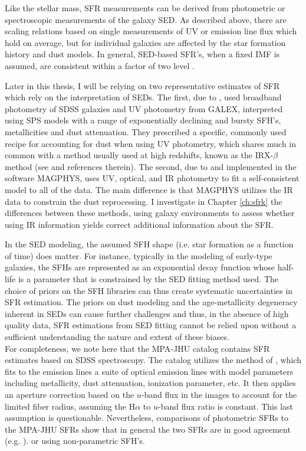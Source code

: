 Like the stellar mass, SFR measurements can be derived from
photometric or spectroscopic measurements of the galaxy SED. As
described above, there are scaling relations based on single
measurements of UV or emission line flux which hold on average, but
for individual galaxies are affected by the star formation history and
dust models.  In general, SED-based SFR's, when a fixed IMF is
assumed, are consistent within a factor of two level
\citep{conroy_modeling_2013}.

Later in this thesis, I will be relying on two representative
estimates of SFR which rely on the interpretation of SEDs.  The first,
due to \citet{salim_uv_2007}, used broadband photometry of SDSS
galaxies and UV photometry from GALEX, interpreted using SPS models
with a range of exponentially declining and bursty SFH's,
metallicities and dust attenuation. They prescribed a specific,
commonly used recipe for accounting for dust when using UV photometry,
which shares much in common with a method usually used at high
redshifts, known as the IRX-$\beta$ method (see \citealt{overzier11a}
and references therein). The second, due to
\citet{da_cunha_simple_2008} and implemented in the software MAGPHYS,
uses UV, optical, and IR photometry to fit a self-consistent model to
all of the data. The main difference is that MAGPHYS utilizes the IR
data to constrain the dust reprocessing. I investigate in Chapter
\ref{ch:sfrk} the differences between these methods, using galaxy
environments to assess whether using IR information yields correct
additional information about the SFR.

In the SED modeling, the assumed SFH shape (i.e. star formation as a
function of time) does matter. For instance, typically in the modeling
of early-type galaxies, the SFHs are represented as an exponential
decay function whose half-life is a parameter that is constrained by
the SED fitting method used. The choice of priors on the SFH libraries
can thus create systematic uncertainties in SFR estimation. The priors
on dust modeling and the age-metallicity degeneracy inherent in SEDs
can cause further challenges and thus, in the absence of high quality
data, SFR estimations from SED fitting cannot be relied upon without a
sufficient understanding the nature and extent of these biases.\\

For completeness, we note here that the MPA-JHU catalog contains SFR
estimates based on SDSS spectroscopy. The catalog utilizes the method
of \citet{brinchmann_physical_2004}, which fits to the emission lines
a suite of optical emission lines with model parameters including
metallicity, dust attenuation, ionization parameter, etc. It then
applies an aperture correction based on the $u$-band flux in the
images to account for the limited fiber radius, assuming the H$\alpha$
to $u$-band flux ratio is constant. This last assumption is
questionable. Nevertheless, comparisons of photometric SFRs to 
the MPA-JHU SFRs show that in general the two SFRs are in good
agreement (e.g. \citealt{salim_uv_2007}).
or using non-parametric SFH's.

